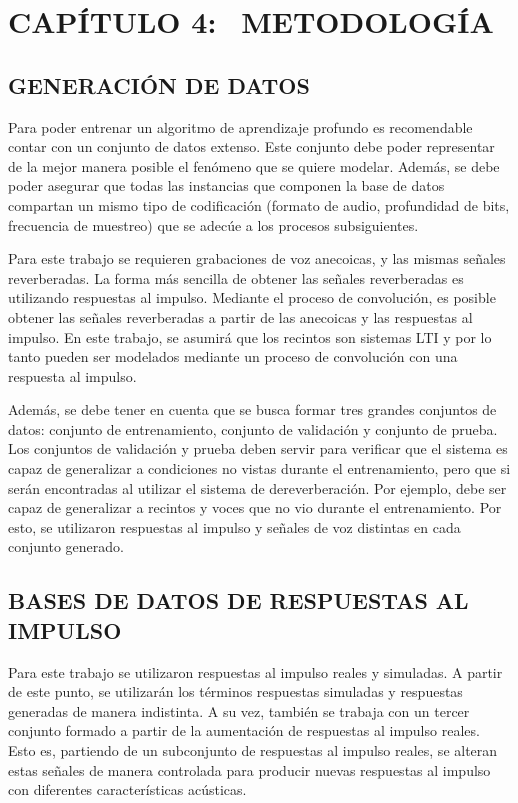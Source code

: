 \section[Metodología]{CAPÍTULO 4:$\ \ \ \ $METODOLOGÍA} 

\subsection[Análisis de datos]{GENERACIÓN DE DATOS}
Para poder entrenar un algoritmo de aprendizaje profundo es recomendable contar con un conjunto de datos extenso. Este conjunto debe poder representar de la mejor manera posible el fenómeno que se quiere modelar. Además, se debe poder asegurar que todas las instancias que componen la base de datos compartan un mismo tipo de codificación (formato de audio, profundidad de bits, frecuencia de muestreo) que se adecúe a los procesos subsiguientes. 

Para este trabajo se requieren grabaciones de voz anecoicas, y las mismas señales reverberadas. La forma más sencilla de obtener las señales reverberadas es utilizando respuestas al impulso. Mediante el proceso de convolución, es posible obtener las señales reverberadas a partir de las anecoicas y las respuestas al impulso. En este trabajo, se asumirá que los recintos son sistemas LTI y por lo tanto pueden ser modelados mediante un proceso de convolución con una respuesta al impulso.

Además, se debe tener en cuenta que se busca formar tres grandes conjuntos de datos: conjunto de entrenamiento, conjunto de validación y conjunto de prueba. Los conjuntos de validación y prueba deben servir para verificar que el sistema es capaz de generalizar a condiciones no vistas durante el entrenamiento, pero que si serán encontradas al utilizar el sistema de dereverberación. Por ejemplo, debe ser capaz de generalizar a recintos y voces que no vio durante el entrenamiento. Por esto, se utilizaron respuestas al impulso y señales de voz distintas en cada conjunto generado.   


\subsection[Base de datos de respuestas al impulso]{BASES DE DATOS DE RESPUESTAS AL IMPULSO}

Para este trabajo se utilizaron respuestas al impulso reales y simuladas. A partir de este punto, se utilizarán los términos respuestas simuladas y respuestas generadas de manera indistinta. A su vez, también se trabaja con un tercer conjunto formado a partir de la aumentación de respuestas al impulso reales. Esto es, partiendo de un subconjunto de respuestas al impulso reales, se alteran estas señales de manera controlada para producir nuevas respuestas al impulso con diferentes características acústicas.

